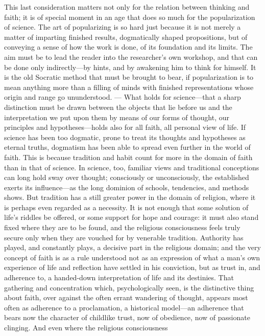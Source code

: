 \documentclass[12pt,a4paper]{article}
\newcommand{\opage}[1]{\marginnote{\footnotesize\textit{[#1]}}}
\begin{document}
This last consideration matters not only for the relation between thinking and faith;
it is of special moment in an age that does so much for the popularization of science.
The art of popularizing is so hard just because it is not merely a matter of imparting
finished results, dogmatically shaped propositions, but of conveying a sense of how
the work is done, of its foundation and its limits. The aim must be to lead the reader
into the researcher's own workshop, and that can be done only indirectly---by hints,
and by awakening him to think for himself. It is the old Socratic method that must be
brought to bear, if popularization is to mean anything more than a filling of minds
with finished representations whose origin and range go ununderstood. ---
What holds for science---that a sharp distinction must be drawn between the objects
that lie before us and the interpretation we put upon them by means of our forms of
thought, our principles and hypotheses---holds also for all faith, all personal view
of life. If science has been too dogmatic, prone to treat its thoughts and hypotheses
as eternal truths, dogmatism has been able to spread even further in the world of
faith. This is because tradition and habit count for more in the domain of faith than
in that of \opage{45}science. In science, too, familiar views and traditional conceptions can
long hold sway over thought; consciously or unconsciously, the established exerts its
influence---as the long dominion of schools, tendencies, and methods shows. But
tradition has a still greater power in the domain of religion, where it is perhaps
even regarded as a necessity. It is not enough that some solution of life's riddles be
offered, or some support for hope and courage: it must also stand fixed where they are
to be found, and the religious consciousness feels truly secure only when they are
vouched for by venerable tradition. Authority has played, and constantly plays, a
decisive part in the religious domain; and the very concept of faith is as a rule
understood not as an expression of what a man's own experience of life and reflection
have settled in his conviction, but as trust in, and adherence to, a handed-down
interpretation of life and its destinies. That gathering and concentration which,
psychologically seen, is the distinctive thing about faith, over against the often
errant wandering of thought, appears most often as adherence to a proclamation, a
historical model---an adherence that bears now the character of childlike trust, now
of obedience, now of passionate clinging. And even where the religious consciousness
\end{document}
